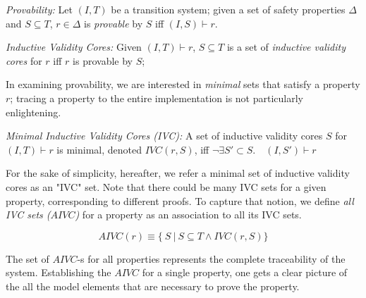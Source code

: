 
\begin{definition}{\emph{Provability:}}
Let $(I, T)$ be a transition system; given a set of safety properties $\Delta$ and $S \subseteq T$, $r \in \Delta$ is \emph{provable} by $S$ iff
$(I, S) \vdash r$.
\end{definition}

\begin{definition}{\emph{Inductive Validity Cores:}}
  \label{def:ivc}
  Given $(I, T)\vdash r$, $S \subseteq
  T$ is a set of {\em inductive validity cores} for $r$
  iff $r$ is provable by $S$;
\end{definition}

In examining provability, we are interested in {\em minimal} sets that satisfy a property $r$; tracing a property to the entire implementation        is not particularly enlightening.

\begin{definition}{\emph{Minimal Inductive Validity Cores (IVC):}}
  \label{def:minimal-ivc}
  A set of inductive validity cores $S$ for $(I, T)\vdash r$ is minimal, denoted $IVC(r, S)$, iff
  $\neg\exists S' \subset S .\quad (I, S') \vdash r $
\end{definition}

For the sake of simplicity, hereafter, we refer a minimal set of inductive validity cores as an "IVC" set.
Note that there could be many IVC sets for a given property, corresponding to different proofs. To capture that notion, we define \emph{all IVC sets ($AIVC$)} for a property as an association to all its IVC sets.

$$ AIVC(r) \equiv  \{\ S~|~S \subseteq T \land  IVC(r, S)\} $$

\noindent The set of $AIVC$-s for all properties represents the complete traceability of the system. Establishing the $AIVC$ for a single property, one gets a clear picture of the all the model elements that are necessary to prove the property.

